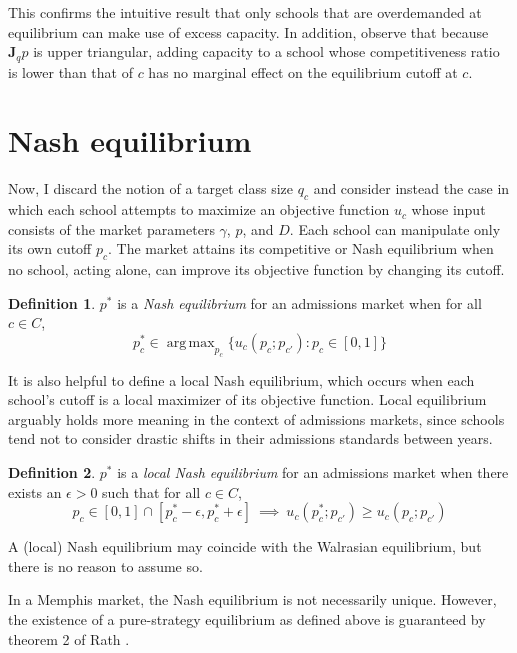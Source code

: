 \documentclass[12pt]{article}
\numberwithin{equation}{subsection}
\theoremstyle{definition}
\newtheorem{definition}{Definition}
\DeclareMathOperator*{\argmax}{arg\,max}
\begin{document}
This confirms the intuitive result that only schools that are overdemanded at equilibrium can make use of excess capacity. In addition, observe that because $\mathbf{J}_q \hat p$ is upper triangular, adding capacity to a school whose competitiveness ratio is lower than that of $c$ has no marginal effect on the equilibrium cutoff at $c$. 



\section{Nash equilibrium}
Now, I discard the notion of a target class size $q_c$ and consider instead the case in which each school attempts to maximize an objective function $u_c$ whose input consists of the market parameters $\gamma$, $p$, and $D$. Each school can manipulate only its own cutoff $p_c$. The market attains its competitive or Nash equilibrium when no school, acting alone, can improve its objective function by changing its cutoff. 

\begin{definition} \label{nasheqconditions} $p^*$ is a \emph{Nash equilibrium} for an admissions market when for all $c \in C$,
\begin{equation} p_c^* \in \argmax_{p_c}\bigl\{ u_c(p_c; p_{c'}): p_c \in [0,1] \bigr\}\end{equation}
\end{definition}

It is also helpful to define a local Nash equilibrium, which occurs when each school's cutoff is a local maximizer of its objective function. Local equilibrium arguably holds more meaning in the context of admissions markets, since schools tend not to consider drastic shifts in their admissions standards between years.

\begin{definition} \label{localnasheqconditions} $p^*$ is a \emph{local Nash equilibrium} for an admissions market when there exists an $\epsilon > 0$ such that for all $c \in C$,
\begin{equation}p_c \in [0,1] \cap [p_c^* - \epsilon,  p_c^* + \epsilon] ~\implies~ u_c(p^*_c; p_{c'}) \geq u_c(p_c; p_{c'}) \end{equation}
\end{definition}
A (local) Nash equilibrium may coincide with the Walrasian equilibrium, but there is no reason to assume so. 

In a Memphis market, the Nash equilibrium is not necessarily unique. However, the existence of a pure-strategy equilibrium as defined above is guaranteed by theorem 2 of Rath \parencite*[][]{existenceofpurestrategyequilibria}. 
\end{document}
